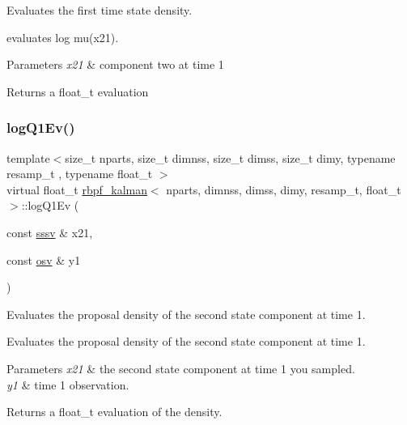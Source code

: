 Evaluates the first time state density. 

evaluates log mu(x21). 
\begin{DoxyParams}{Parameters}
{\em x21} & component two at time 1 \\
\hline
\end{DoxyParams}
\begin{DoxyReturn}{Returns}
a float\+\_\+t evaluation 
\end{DoxyReturn}
\mbox{\label{classrbpf__kalman_aa9f14f59792b7de573439e318e0a451b}} 
\subsubsection{\texorpdfstring{log\+Q1\+Ev()}{logQ1Ev()}}
{\footnotesize\ttfamily template$<$size\+\_\+t nparts, size\+\_\+t dimnss, size\+\_\+t dimss, size\+\_\+t dimy, typename resamp\+\_\+t , typename float\+\_\+t $>$ \\
virtual float\+\_\+t \hyperlink{classrbpf__kalman}{rbpf\+\_\+kalman}$<$ nparts, dimnss, dimss, dimy, resamp\+\_\+t, float\+\_\+t $>$\+::log\+Q1\+Ev (\begin{DoxyParamCaption}\item[{const \hyperlink{classrbpf__kalman_a616e56c08c1a6b476e065b2200433915}{sssv} \&}]{x21,  }\item[{const \hyperlink{classrbpf__kalman_ae6e59c034c1b0abc7871887ae088055e}{osv} \&}]{y1 }\end{DoxyParamCaption})\hspace{0.3cm}{\ttfamily [pure virtual]}}



Evaluates the proposal density of the second state component at time 1. 

Evaluates the proposal density of the second state component at time 1. 
\begin{DoxyParams}{Parameters}
{\em x21} & the second state component at time 1 you sampled. \\
\hline
{\em y1} & time 1 observation. \\
\hline
\end{DoxyParams}
\begin{DoxyReturn}{Returns}
a float\+\_\+t evaluation of the density. 
\end{DoxyReturn}
\mbox{\label{classrbpf__kalman_a532c85ee43223a4c727de2d636ee8e45}} 
